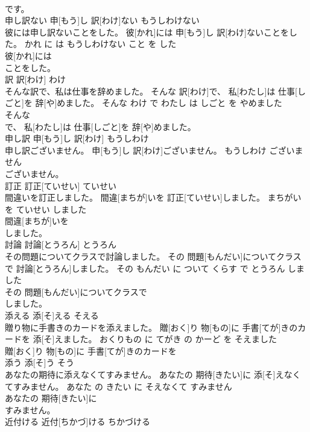 \documentclass[8pt]{extreport}
\begin{document}
\begin{CJK}{UTF8}{min}
\\	です。			
\\	申し訳ない	申[もう]し 訳[わけ]ない	もうしわけない	
\\	彼には申し訳ないことをした。	彼[かれ]には 申[もう]し 訳[わけ]ないことをした。	かれ に は もうしわけない こと を した	
\\	彼[かれ]には
\\	ことをした。			
\\	訳	訳[わけ]	わけ	
\\	そんな訳で、私は仕事を辞めました。	そんな 訳[わけ]で、 私[わたし]は 仕事[しごと]を 辞[や]めました。	そんな わけ で わたし は しごと を やめました	
\\	そんな
\\	で、 私[わたし]は 仕事[しごと]を 辞[や]めました。			
\\	申し訳	申[もう]し 訳[わけ]	もうしわけ	
\\	申し訳ございません。	申[もう]し 訳[わけ]ございません。	もうしわけ ございません	
\\	ございません。			
\\	訂正	訂正[ていせい]	ていせい	
\\	間違いを訂正しました。	間違[まちが]いを 訂正[ていせい]しました。	まちがい を ていせい しました	
\\	間違[まちが]いを
\\	しました。			
\\	討論	討論[とうろん]	とうろん	
\\	その問題についてクラスで討論しました。	その 問題[もんだい]についてクラスで 討論[とうろん]しました。	その もんだい に ついて くらす で とうろん しました	
\\	その 問題[もんだい]についてクラスで
\\	しました。			
\\	添える	添[そ]える	そえる	
\\	贈り物に手書きのカードを添えました。	贈[おく]り 物[もの]に 手書[てが]きのカードを 添[そ]えました。	おくりもの に てがき の かーど を そえました	
\\	贈[おく]り 物[もの]に 手書[てが]きのカードを
\\	添う	添[そ]う	そう	
\\	あなたの期待に添えなくてすみません。	あなたの 期待[きたい]に 添[そ]えなくてすみません。	あなた の きたい に そえなくて すみません	
\\	あなたの 期待[きたい]に
\\	すみません。			
\\	近付ける	近付[ちかづ]ける	ちかづける	

\end{CJK}
\end{document}

